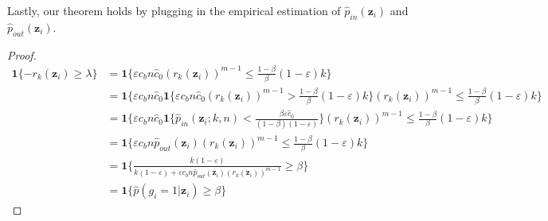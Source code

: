 \documentclass[nohyperref]{article}
\newcommand{\bz}{\mathbf{z}}
\theoremstyle{plain}
\theoremstyle{definition}
\theoremstyle{remark}
\begin{document}
Lastly, our theorem holds by plugging in the empirical estimation of $\hat p_{in}(\bz_i)$ and $\hat p_{out}(\bz_i)$. 

\begin{proof}

\begin{align*}
    \mathbf{1}\{-r_k(\bz_i) \ge \lambda\} &= \mathbf{1}\{\varepsilon c_b n \hat{c}_{0}(r_k(\bz_i))^{m-1} \le \frac{1-\beta}{\beta}(1-\varepsilon)k\} \\
    &= \mathbf{1}\{\varepsilon c_b n \hat{c}_{0}\mathbf{1}\{\varepsilon c_b n \hat{c}_{0} (r_k(\bz_i))^{m-1} > \frac{1-\beta}{\beta}(1-\varepsilon)k\}(r_k(\bz_i))^{m-1} \le \frac{1-\beta}{\beta}(1-\varepsilon)k\} \\
    &= \mathbf{1}\{\varepsilon c_b n \hat{c}_{0} \mathbf{1}\{\hat{p}_{in}(\bz_i;k, n) < \frac{\beta\varepsilon\hat{c}_{0}}{(1-\beta)(1-\varepsilon)}\}(r_k(\bz_i))^{m-1} \le \frac{1-\beta}{\beta}(1-\varepsilon)k\} \\
    &= \mathbf{1}\{\varepsilon c_b n  \hat{p}_{out}(\bz_i)(r_k(\bz_i))^{m-1} \le \frac{1-\beta}{\beta}(1-\varepsilon)k\} \\
    &= \mathbf{1}\{\frac{k(1 - \varepsilon)}{k(1 - \varepsilon) + \varepsilon c_b n\hat{p}_{out}(\bz_i)(r_k(\bz_i))^{m-1}} \ge \beta\} \\
    &= \mathbf{1}\{\hat{p}(g_i = 1|\bz_i) \ge \beta\}
\end{align*}


\end{proof}


 
\end{document}
